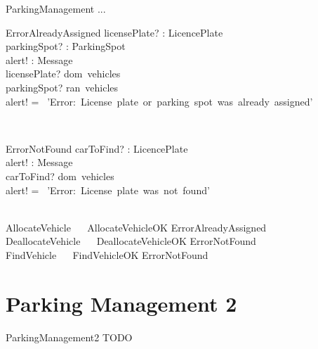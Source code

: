\documentclass[12pt]{article}
\begin{document}
\begin{spacing}{1.5}
\newpage

\begin{class}{ParkingManagement}
...\\
\begin{op}{ErrorAlreadyAssigned}
licensePlate? : LicencePlate\\
parkingSpot? : ParkingSpot\\
alert! : Message\\
\ST
licensePlate? \in dom~vehicles\\
parkingSpot? \in ran~vehicles\\
alert! = \ 'Error:\ License\ plate\ or\ parking\ spot\ was\ already\ assigned'
\end{op}\\
\begin{op}{ErrorNotFound}
carToFind? : LicencePlate\\
alert! : Message\\
\ST
carToFind? \notin dom~vehicles\\
alert! = \ 'Error:\ License\ plate\ was\ not\ found'
\end{op}\\
AllocateVehicle  \ \mathrel{\widehat{=}} \ AllocateVehicleOK \vee ErrorAlreadyAssigned \\
DeallocateVehicle  \ \mathrel{\widehat{=}} \ DeallocateVehicleOK \vee ErrorNotFound \\
FindVehicle  \ \mathrel{\widehat{=}} \ FindVehicleOK \vee ErrorNotFound \\
\end{class}

\newpage

\section{Parking Management 2}

\begin{class}{ParkingManagement2}
TODO
\end{class}





\end{spacing}
\end{document}

